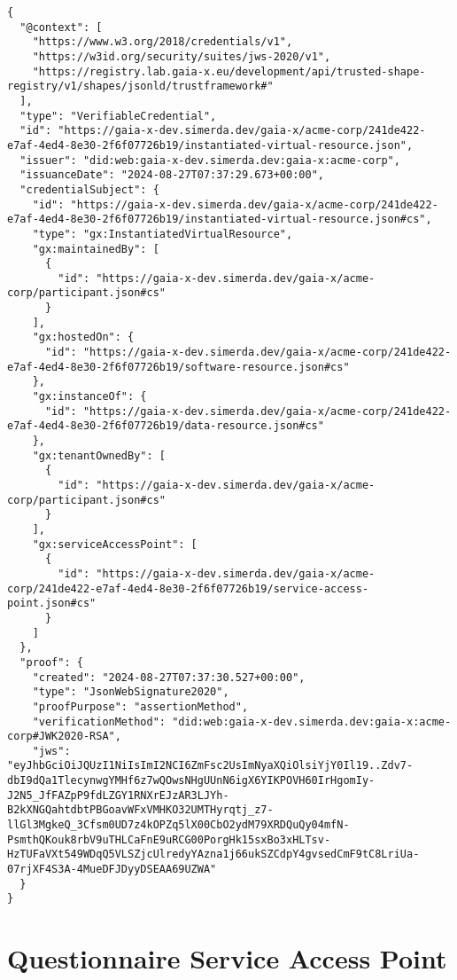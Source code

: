 \begin{verbatim}
{
  "@context": [
    "https://www.w3.org/2018/credentials/v1",
    "https://w3id.org/security/suites/jws-2020/v1",
    "https://registry.lab.gaia-x.eu/development/api/trusted-shape-registry/v1/shapes/jsonld/trustframework#"
  ],
  "type": "VerifiableCredential",
  "id": "https://gaia-x-dev.simerda.dev/gaia-x/acme-corp/241de422-e7af-4ed4-8e30-2f6f07726b19/instantiated-virtual-resource.json",
  "issuer": "did:web:gaia-x-dev.simerda.dev:gaia-x:acme-corp",
  "issuanceDate": "2024-08-27T07:37:29.673+00:00",
  "credentialSubject": {
    "id": "https://gaia-x-dev.simerda.dev/gaia-x/acme-corp/241de422-e7af-4ed4-8e30-2f6f07726b19/instantiated-virtual-resource.json#cs",
    "type": "gx:InstantiatedVirtualResource",
    "gx:maintainedBy": [
      {
        "id": "https://gaia-x-dev.simerda.dev/gaia-x/acme-corp/participant.json#cs"
      }
    ],
    "gx:hostedOn": {
      "id": "https://gaia-x-dev.simerda.dev/gaia-x/acme-corp/241de422-e7af-4ed4-8e30-2f6f07726b19/software-resource.json#cs"
    },
    "gx:instanceOf": {
      "id": "https://gaia-x-dev.simerda.dev/gaia-x/acme-corp/241de422-e7af-4ed4-8e30-2f6f07726b19/data-resource.json#cs"
    },
    "gx:tenantOwnedBy": [
      {
        "id": "https://gaia-x-dev.simerda.dev/gaia-x/acme-corp/participant.json#cs"
      }
    ],
    "gx:serviceAccessPoint": [
      {
        "id": "https://gaia-x-dev.simerda.dev/gaia-x/acme-corp/241de422-e7af-4ed4-8e30-2f6f07726b19/service-access-point.json#cs"
      }
    ]
  },
  "proof": {
    "created": "2024-08-27T07:37:30.527+00:00",
    "type": "JsonWebSignature2020",
    "proofPurpose": "assertionMethod",
    "verificationMethod": "did:web:gaia-x-dev.simerda.dev:gaia-x:acme-corp#JWK2020-RSA",
    "jws": "eyJhbGciOiJQUzI1NiIsImI2NCI6ZmFsc2UsImNyaXQiOlsiYjY0Il19..Zdv7-dbI9dQa1TlecynwgYMHf6z7wQOwsNHgUUnN6igX6YIKPOVH60IrHgomIy-J2N5_JfFAZpP9fdLZGY1RNXrEJzAR3LJYh-B2kXNGQahtdbtPBGoavWFxVMHKO32UMTHyrqtj_z7-llGl3MgkeQ_3Cfsm0UD7z4kOPZq5lX00CbO2ydM79XRDQuQy04mfN-PsmthQKouk8rbV9uTHLCaFnE9uRCG00PorgHk15sxBo3xHLTsv-HzTUFaVXt549WDqQ5VLSZjcUlredyYAzna1j66ukSZCdpY4gvsedCmF9tC8LriUa-07rjXF4S3A-4MueDFJDyyDSEAA69UZWA"
  }
}
\end{verbatim}


\section{Questionnaire Service Access Point}

